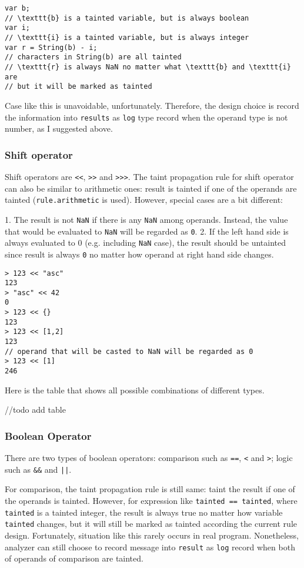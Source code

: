 {\begin{verbatim}
var b; 
// \texttt{b} is a tainted variable, but is always boolean
var i;
// \texttt{i} is a tainted variable, but is always integer
var r = String(b) - i;
// characters in String(b) are all tainted
// \texttt{r} is always NaN no matter what \texttt{b} and \texttt{i} are
// but it will be marked as tainted
\end{verbatim}

Case like this is unavoidable, unfortunately. Therefore, the design choice is record the information into \texttt{results} as \texttt{log} type record when the operand type is not number, as I suggested above.

\subsubsection{Shift operator}

Shift operators are \texttt{<<}, \texttt{>>} and \texttt{>>>}. The taint propagation rule for shift operator can also be similar to arithmetic ones: result is tainted if one of the operands are tainted (\texttt{rule.arithmetic} is used). However, special cases are a bit different: 

1. The result is not \texttt{NaN} if there is any \texttt{NaN} among operands. Instead, the value that would be evaluated to \texttt{NaN} will be regarded as \texttt{0}. 
2. If the left hand side is always evaluated to 0 (e.g. including \texttt{NaN} case), the result should be untainted since result is always \texttt{0} no matter how operand at right hand side changes.

\begin{verbatim}
> 123 << "asc"
123
> "asc" << 42
0
> 123 << {}
123
> 123 << [1,2]
123
// operand that will be casted to NaN will be regarded as 0
> 123 << [1]
246
\end{verbatim}

Here is the table that shows all possible combinations of different types.

//todo add table

\subsubsection{Boolean Operator}

There are two types of boolean operators: comparison such as \texttt{==}, \texttt{<} and \texttt{>}; logic such as \texttt{&&} and \texttt{||}. 

For comparison, the taint propagation rule is still same: taint the result if one of the operands is tainted. However, for expression like \texttt{tainted == tainted}, where \texttt{tainted} is a tainted integer, the result is always true no matter how variable \texttt{tainted} changes, but it will still be marked as tainted according the current rule design. Fortunately, situation like this rarely occurs in real program.  Nonetheless, analyzer can still choose to record message into \texttt{result} as \texttt{log} record when both of operands of comparison are tainted.

}
